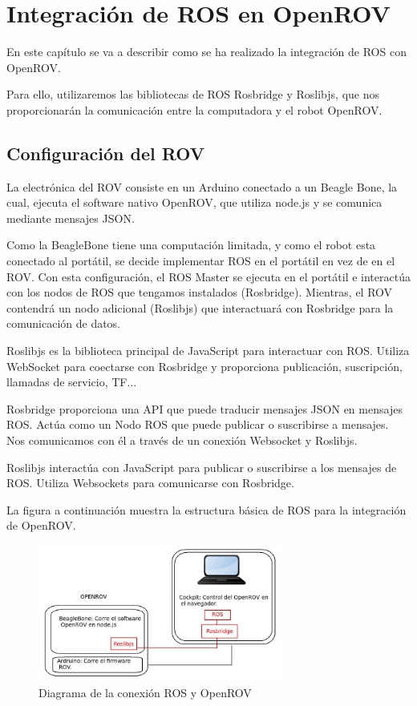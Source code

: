 \chapter{Integración de ROS en OpenROV}
\label{cap:integracionROS}

En este capítulo se va a describir como se ha realizado la integración de ROS con OpenROV\cite{ros_rov}.

Para ello, utilizaremos las bibliotecas de ROS Rosbridge y Roslibjs, que nos proporcionarán la comunicación entre la computadora y el robot OpenROV.

\section{Configuración del ROV}
\label{cap:Configuracion del ROV}
La electrónica del ROV consiste en un Arduino conectado a un Beagle Bone, la cual, ejecuta el software nativo OpenROV, que utiliza node.js y se comunica mediante mensajes JSON.

Como la BeagleBone tiene una computación limitada, y como el robot esta conectado al portátil, se decide implementar ROS en el portátil en vez de en el ROV. Con esta configuración, el ROS Master se ejecuta en el portátil e interactúa con los nodos de ROS que tengamos instalados (Rosbridge).
Mientras, el ROV contendrá un nodo adicional (Roslibjs) que interactuará con Rosbridge para la comunicación de datos.

Roslibjs es la biblioteca principal de JavaScript para interactuar con ROS. Utiliza WebSocket para coectarse con Rosbridge y proporciona publicación, suscripción, llamadas de servicio, TF...

Rosbridge proporciona una API que puede traducir mensajes JSON en mensajes ROS. Actúa como un Nodo ROS que puede publicar o suscribirse a mensajes. Nos comunicamos con él a través de un conexión Websocket y Roslibjs.

Roslibjs interactúa con JavaScript para publicar o suscribirse a los mensajes de ROS. Utiliza Websockets para comunicarse con Rosbridge.

La figura a continuación muestra la estructura básica de ROS para la integración de OpenROV.

\begin{figure} [hbtp]
  \begin{center}
    \includegraphics[width=8cm]{img/cap4/conect_ros_rov}
  \end{center}
  \caption{Diagrama de la conexión ROS y OpenROV}
  \label{fig:conect_ros_rov}
\end{figure}


